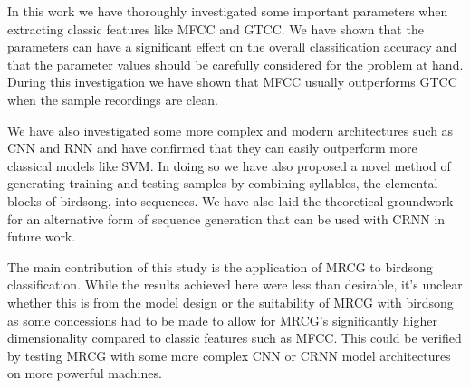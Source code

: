 In this work we have thoroughly investigated some important parameters when
extracting classic features like MFCC and GTCC\@. We have shown that the
parameters can have a significant effect on the overall classification accuracy
and that the parameter values should be carefully considered for the problem at
hand. During this investigation we have shown that MFCC usually outperforms GTCC
when the sample recordings are clean.

We have also investigated some more complex and modern architectures such as CNN
and RNN and have confirmed that they can easily outperform more classical models
like SVM\@. In doing so we have also proposed a novel method of generating
training and testing samples by combining syllables, the elemental blocks of
birdsong, into sequences. We have also laid the theoretical groundwork for an
alternative form of sequence generation that can be used with CRNN in future work.

The main contribution of this study is the application of MRCG to birdsong
classification. While the results achieved here were less than desirable, it's
unclear whether this is from the model design or the suitability of MRCG with
birdsong as some concessions had to be made to allow for MRCG's significantly
higher dimensionality compared to classic features such as MFCC\@. This could be
verified by testing MRCG with some more complex CNN or CRNN model architectures
on more powerful machines.
